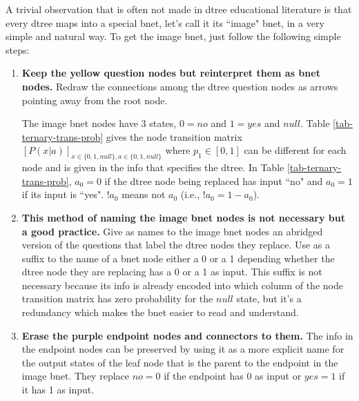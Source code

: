 A trivial 
observation
that is often not made
in dtree educational literature
is that every dtree 
maps into a special bnet, 
let's call it
its ``image" bnet,
in a very simple and natural way.
To get the
 image bnet, just follow the
following simple steps:
\begin{enumerate}
\item {\bf Keep
the yellow question nodes
but reinterpret them as bnet nodes.}
Redraw the connections among
the dtree question nodes
 as arrows pointing
away from the root node.

The image bnet nodes
have 3 states,  $0=no$ and
$1=yes$ and $null$.
Table \ref{tab-ternary-trans-prob}
gives the 
node transition matrix $[P(x|a)]_{
x\in \{0,1,null\}, 
a\in \{0,1,null\}}$
where $p_1\in[0,1]$ can be 
different for each node and is given
in the info that specifies    
the dtree. In Table 
\ref{tab-ternary-trans-prob},
$a_0= 0$ if the
dtree node being replaced has input
``no" and $a_0=1$ if its 
input is ``yes".
$!a_0$ means not $a_0$ (i.e., $!a_0=1-a_0$).
\item
{\bf This method of naming
the image bnet nodes
is not necessary but a good practice.}
Give as names to the image bnet
nodes 
an abridged 
version of
the questions
that label the dtree nodes they replace.
Use as a suffix
to the name of a 
bnet node either a 0 or a 1
depending whether
the dtree node they are replacing
has a 0 or a 1 as input.
This suffix is not
necessary because its
info is already encoded
into
which column
of the node transition matrix has 
zero probability for the
$null$ state, but
it's  a redundancy which makes
the bnet easier to read and understand.
\item {\bf Erase the purple endpoint
nodes and connectors to them.} The
info in the endpoint nodes
can be preserved
by using it
as a more
explicit name
for the output
states of the
leaf node that 
is the parent
to the endpoint 
in the image bnet.
They replace $no=0$ if the
endpoint has 0 as input 
or $yes=1$ if it has 1 as input.
\end{enumerate}

